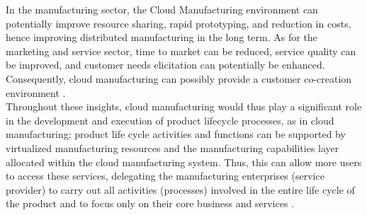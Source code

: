 In the manufacturing sector, the Cloud Manufacturing environment can potentially improve resource sharing, rapid prototyping, and reduction in costs, hence improving distributed manufacturing in the long term. As for the marketing and service sector, time to market can be reduced, service quality can be improved, and customer needs elicitation can potentially be enhanced. Consequently, cloud manufacturing can possibly provide a customer co-creation environment \parencite{mourad_assessment_2020}.\\
Throughout these insights, cloud manufacturing would thus play a significant role in the development and execution of product lifecycle processes, as in cloud manufacturing; product life cycle activities and functions can be supported by virtualized manufacturing resources and the manufacturing capabilities layer allocated within the cloud manufacturing system. Thus, this can allow more users to access these services, delegating the manufacturing enterprises (service provider) to carry out all activities (processes) involved in the entire life cycle of the product and to focus only on their core business and services \parencite{tao_cloud_2011}.

